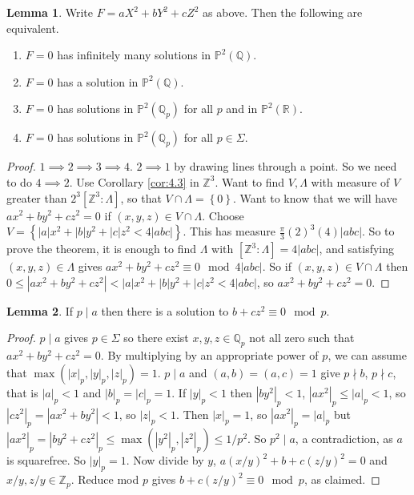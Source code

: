 \documentclass{article}
\newcommand{\Z}{\mathbb{Z}}
\newcommand{\Q}{\mathbb{Q}}
\newcommand{\R}{\mathbb{R}}
\renewcommand{\P}{\mathbb{P}}
\newcommand{\rb}[1]{\left( #1 \right)}
\renewcommand{\sb}[1]{\left[ #1 \right]}
\newcommand{\cb}[1]{\left\{ #1 \right\}}
\newcommand{\abs}[1]{\left\lvert #1 \right\rvert}
\theoremstyle{definition}\newtheorem{definition}{Definition}[section]
\theoremstyle{definition}\newtheorem{remark}[definition]{Remark}
\theoremstyle{definition}\newtheorem*{example}{Example}
\theoremstyle{definition}\newtheorem*{note}{Note}
\newtheorem{lemma}[definition]{Lemma}
\begin{document}
\begin{lemma}
Write $ F = aX^2 + bY^2 + cZ^2 $ as above. Then the following are equivalent.
\begin{enumerate}
\item $ F = 0 $ has infinitely many solutions in $ \P^2\rb{\Q} $.
\item $ F = 0 $ has a solution in $ \P^2\rb{\Q} $.
\item $ F = 0 $ has solutions in $ \P^2\rb{\Q_p} $ for all $ p $ and in $ \P^2\rb{\R} $.
\item $ F = 0 $ has solutions in $ \P^2\rb{\Q_p} $ for all $ p \in \Sigma $.
\end{enumerate}
\end{lemma}

\begin{proof}
$ 1 \implies 2 \implies 3 \implies 4 $. $ 2 \implies 1 $ by drawing lines through a point. So we need to do $ 4 \implies 2 $. Use Corollary \ref{cor:4.3} in $ \Z^3 $. Want to find $ V, \Lambda $ with measure of $ V $ greater than $ 2^3\sb{\Z^3 : \Lambda} $, so that $ V \cap \Lambda = \cb{0} $. Want to know that we will have $ ax^2 + by^2 + cz^2 = 0 $ if $ \rb{x, y, z} \in V \cap \Lambda $. Choose $ V = \cb{\abs{a}x^2 + \abs{b}y^2 + \abs{c}z^2 < 4\abs{abc}} $. This has measure $ \tfrac{\pi}{3}\rb{2}^3\rb{4}\abs{abc} $. So to prove the theorem, it is enough to find $ \Lambda $ with $ \sb{\Z^3 : \Lambda} = 4\abs{abc} $, and satisfying $ \rb{x, y, z} \in \Lambda $ gives $ ax^2 + by^2 + cz^2 \equiv 0 \mod 4\abs{abc} $. So if $ \rb{x, y, z} \in V \cap \Lambda $ then $ 0 \le \abs{ax^2 + by^2 + cz^2} < \abs{a}x^2 + \abs{b}y^2 + \abs{c}z^2 < 4\abs{abc} $, so $ ax^2 + by^2 + cz^2 = 0 $.
\end{proof}


\begin{lemma}
If $ p \mid a $ then there is a solution to $ b + cz^2 \equiv 0 \mod p $.
\end{lemma}

\begin{proof}
$ p \mid a $ gives $ p \in \Sigma $ so there exist $ x, y, z \in \Q_p $ not all zero such that $ ax^2 + by^2 + cz^2 = 0 $. By multiplying by an appropriate power of $ p $, we can assume that $ \max\rb{\abs{x}_p, \abs{y}_p, \abs{z}_p} = 1 $. $ p \mid a $ and $ \rb{a, b} = \rb{a, c} = 1 $ give $ p \nmid b $, $ p \nmid c $, that is $ \abs{a}_p < 1 $ and $ \abs{b}_p = \abs{c}_p = 1 $. If $ \abs{y}_p < 1 $ then $ \abs{by^2}_p < 1 $, $ \abs{ax^2}_p \le \abs{a}_p < 1 $, so $ \abs{cz^2}_p = \abs{ax^2 + by^2} < 1 $, so $ \abs{z}_p < 1 $. Then $ \abs{x}_p = 1 $, so $ \abs{ax^2}_p = \abs{a}_p $ but $ \abs{ax^2}_p = \abs{by^2 + cz^2}_p \le \max\rb{\abs{y^2}_p, \abs{z^2}_p} \le 1 / p^2 $. So $ p^2 \mid a $, a contradiction, as $ a $ is squarefree. So $ \abs{y}_p = 1 $. Now divide by $ y $, $ a\rb{x / y}^2 + b + c\rb{z / y}^2 = 0 $ and $ x / y, z / y \in \Z_p $. Reduce mod $ p $ gives $ b + c\rb{z / y}^2 \equiv 0 \mod p $, as claimed.
\end{proof}
\end{document}
